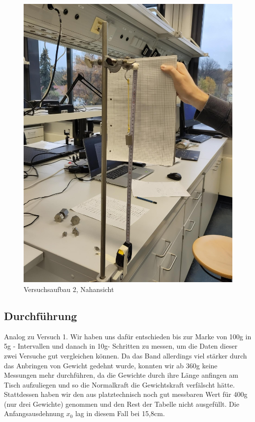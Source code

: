 \documentclass[class=article, crop=false]{standalone}
\begin{document}
\begin{figure}
\centering
\includegraphics[width=\textwidth,height=0.2\textheight]{Bilder/V2B2.jpeg}
\caption{Versuchsaufbau 2, Nahansicht}
\end{figure}

\hypertarget{durchfuxfchrung-1}{%
\subsection{Durchführung}\label{durchfuxfchrung-1}}

Analog zu Versuch 1. Wir haben uns dafür entschieden bis zur Marke von
100g in 5g - Intervallen und danach in 10g- Schritten zu messen, um die
Daten dieser zwei Versuche gut vergleichen können. Da das Band
allerdings viel stärker durch das Anbringen von Gewicht gedehnt wurde,
konnten wir ab 360g keine Messungen mehr durchführen, da die Gewichte
durch ihre Länge anfingen am Tisch aufzuliegen und so die Normalkraft
die Gewichtskraft verfälscht hätte. Stattdessen haben wir den aus
platztechnisch noch gut messbaren Wert für 400g (nur drei Gewichte)
genommen und den Rest der Tabelle nicht ausgefüllt. Die
Anfangsausdehnung \(x_0\) lag in diesem Fall bei 15,8cm.
\end{document}
